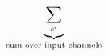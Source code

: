 \documentclass[preview]{standalone}
\begin{document}
\begin{align*}
\special{dvisvgm:raw <g id='unique000'>}\underbrace{\sum_{c'}}_{\text{sum over input channels}}\special{dvisvgm:raw </g>}
\end{align*}
\end{document}
